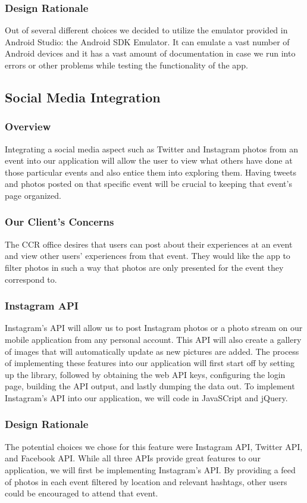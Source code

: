\documentclass[draftclsnofoot, onecolumn, 10pt, compsoc]{IEEEtran}
\begin{document}
			\subsubsection{Design Rationale}
				Out of several different choices we decided to utilize the emulator provided in Android Studio: the Android SDK Emulator. It can emulate a vast number of Android devices and it has a vast amount of documentation in case we run into errors or other problems while testing the functionality of the app.
				~\cite{Android_SDK_Emulator}
		\subsection{Social Media Integration}
			\subsubsection{Overview}
				Integrating a social media aspect such as Twitter and Instagram photos from an event into our application will allow the user to view what others have done at those particular events and also entice them into exploring them. Having tweets and photos posted on that specific event will be crucial to keeping that event's page organized. 
			\subsubsection{Our Client's Concerns}
				The CCR office desires that users can post about their experiences at an event and view other users' experiences from that event. They would like the app to filter photos in such a way that photos are only presented for the event they correspond to.
			\subsubsection{Instagram API}
				Instagram's API will allow us to post Instagram photos or a photo stream on our mobile application from any personal account. This API will also create a gallery of images that will automatically update as new pictures are added. The process of implementing these features into our application will first start off by setting up the library, followed by obtaining the web API keys, configuring the login page, building the API output, and lastly dumping the data out. To implement Instagram's API into our application, we will code in JavaSCript and jQuery.
				~\cite{InstaAPI}
			\subsubsection{Design Rationale}
				The potential choices we chose for this feature were Instagram API, Twitter API, and Facebook API. While all three APIs provide great features to our application, we will first be implementing Instagram's API. By providing a feed of photos in each event filtered by location and relevant hashtags, other users could be encouraged to attend that event.
\end{document}
